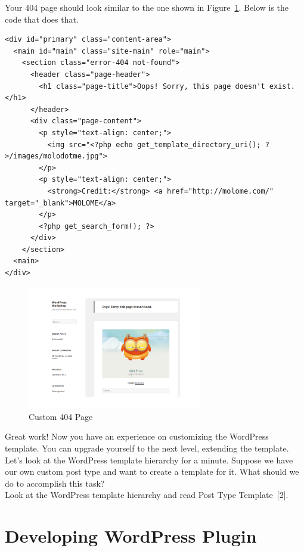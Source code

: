 \documentclass{article}
\begin{document}
\noindent Your 404 page should look similar to the one shown in
Figure~\ref{fig:custom-404-page}. Below is the code that does that.

\begin{verbatim}
<div id="primary" class="content-area">
  <main id="main" class="site-main" role="main">
    <section class="error-404 not-found">
      <header class="page-header">
        <h1 class="page-title">Oops! Sorry, this page doesn't exist.</h1>
      </header>
      <div class="page-content">
        <p style="text-align: center;">
          <img src="<?php echo get_template_directory_uri(); ?>/images/molodotme.jpg">
        </p>
        <p style="text-align: center;">
          <strong>Credit:</strong> <a href="http://molome.com/" target="_blank">MOLOME</a>
        </p>
        <?php get_search_form(); ?>
      </div>
    </section>
  <main>
</div>
\end{verbatim}

\begin{figure}[t]
    \centering
    \includegraphics[width=3in]{figures/custom-404-page}
    \caption{Custom 404 Page}
    \label{fig:custom-404-page}
\end{figure}

\noindent Great work! Now you have an experience on customizing the WordPress
template. You can upgrade yourself to the next level, extending the template.
\\

 Let's look at the WordPress template hierarchy for a
minute. Suppose we have our own custom post type and want to create a template
for it. What should we do to accomplish this task? \\

 Look at the WordPress template hierarchy and read Post
Type Template~[2].

\section*{Developing WordPress Plugin}
\end{document}

